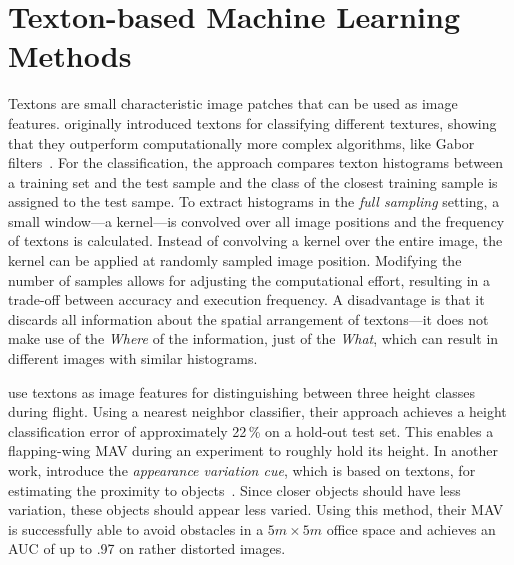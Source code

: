 \section{Texton-based Machine Learning Methods}
\label{sec:textonbasedapproaches}

Textons are small characteristic image patches that can be used as image features.
\citet{varma2005statistical} originally introduced textons for
classifying different textures, showing that they outperform
computationally more complex algorithms, like Gabor
filters~\cite{varma2005statistical}. For the classification, the approach compares texton histograms between a training set and the test sample and the class of the closest training sample is assigned to the test sampe. To extract histograms in the \emph{full sampling} setting, a small window---a kernel---is convolved over all image positions and the frequency of textons is calculated.
Instead of convolving a kernel over the entire image, the kernel can be applied at randomly sampled image position\cite{sde2012sub}. %
Modifying the number of samples allows for adjusting the computational effort, resulting in a
trade-off between accuracy and execution frequency. A disadvantage is
that it discards all information about the spatial arrangement of
textons---it does not make use of the \emph{Where} of the information,
just of the \emph{What}, which can result in different images with
similar histograms.

\citet{de2009design} use textons as image features for distinguishing
between three height classes during flight. Using
a nearest neighbor classifier, their approach achieves a height
classification error of approximately 22\,\% on a hold-out test set.
This enables a flapping-wing MAV during an experiment to roughly hold
its height. In another work, \citet{de2012appearance} introduce
the \emph{appearance variation cue}, which is based on textons, for estimating the proximity to
objects~\cite{de2012appearance}. Since closer objects should have less
variation, these objects should appear less varied. Using this method,
their MAV is successfully able to avoid obstacles in a $5m \times 5m$
office space and achieves an AUC of up to .97 on rather distorted
images.

